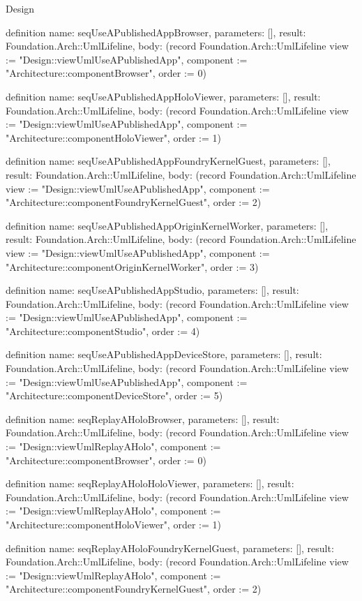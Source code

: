 \begin{lexlean}{Design}
\begin{semanticmodule}
definition{
  name: seqUseAPublishedAppBrowser,
  parameters: [],
  result: Foundation.Arch::UmlLifeline,
  body: (record Foundation.Arch::UmlLifeline {view := "Design::viewUmlUseAPublishedApp", component := "Architecture::componentBrowser", order := 0})
}

definition{
  name: seqUseAPublishedAppHoloViewer,
  parameters: [],
  result: Foundation.Arch::UmlLifeline,
  body: (record Foundation.Arch::UmlLifeline {view := "Design::viewUmlUseAPublishedApp", component := "Architecture::componentHoloViewer", order := 1})
}

definition{
  name: seqUseAPublishedAppFoundryKernelGuest,
  parameters: [],
  result: Foundation.Arch::UmlLifeline,
  body: (record Foundation.Arch::UmlLifeline {view := "Design::viewUmlUseAPublishedApp", component := "Architecture::componentFoundryKernelGuest", order := 2})
}

definition{
  name: seqUseAPublishedAppOriginKernelWorker,
  parameters: [],
  result: Foundation.Arch::UmlLifeline,
  body: (record Foundation.Arch::UmlLifeline {view := "Design::viewUmlUseAPublishedApp", component := "Architecture::componentOriginKernelWorker", order := 3})
}

definition{
  name: seqUseAPublishedAppStudio,
  parameters: [],
  result: Foundation.Arch::UmlLifeline,
  body: (record Foundation.Arch::UmlLifeline {view := "Design::viewUmlUseAPublishedApp", component := "Architecture::componentStudio", order := 4})
}

definition{
  name: seqUseAPublishedAppDeviceStore,
  parameters: [],
  result: Foundation.Arch::UmlLifeline,
  body: (record Foundation.Arch::UmlLifeline {view := "Design::viewUmlUseAPublishedApp", component := "Architecture::componentDeviceStore", order := 5})
}

definition{
  name: seqReplayAHoloBrowser,
  parameters: [],
  result: Foundation.Arch::UmlLifeline,
  body: (record Foundation.Arch::UmlLifeline {view := "Design::viewUmlReplayAHolo", component := "Architecture::componentBrowser", order := 0})
}

definition{
  name: seqReplayAHoloHoloViewer,
  parameters: [],
  result: Foundation.Arch::UmlLifeline,
  body: (record Foundation.Arch::UmlLifeline {view := "Design::viewUmlReplayAHolo", component := "Architecture::componentHoloViewer", order := 1})
}

definition{
  name: seqReplayAHoloFoundryKernelGuest,
  parameters: [],
  result: Foundation.Arch::UmlLifeline,
  body: (record Foundation.Arch::UmlLifeline {view := "Design::viewUmlReplayAHolo", component := "Architecture::componentFoundryKernelGuest", order := 2})
}


\end{semanticmodule}
\end{lexlean}
